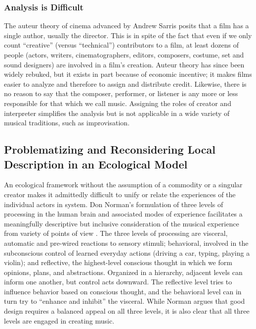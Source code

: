 \subsubsection{Analysis is Difficult}
\label{Gurevich:subsub:4_1_3}
The auteur theory of cinema advanced by Andrew Sarris \cite{Sarris:1963} posits that a film has a single author, usually the director. This is in spite of the fact that even if we only count ``creative'' (versus ``technical'') contributors to a film, at least dozens of people (actors, writers, cinematographers, editors, composers, costume, set and sound designers) are involved in a film's creation. Auteur theory has since been widely rebuked, but it exists in part because of economic incentive; it makes films easier to analyze and therefore to assign and distribute credit. Likewise, there is no reason to say that the composer, performer, or listener is any more or less responsible for that which we call music. Assigning the roles of creator and interpreter simplifies the analysis but is not applicable in a wide variety of musical traditions, such as improvisation.

\subsection{Problematizing and Reconsidering Local Description in an Ecological Model}
\label{Gurevich:sub:4_2}
An ecological framework without the assumption of a commodity or a singular creator makes it admittedly difficult to unify or relate the experiences of the individual actors in system. Don Norman's formulation of three levels of processing in the human brain and associated modes of experience facilitates a meaningfully descriptive but inclusive consideration of the musical experience from variety of points of view \cite{Norman:2004}. The three levels of processing are visceral, automatic and pre-wired reactions to sensory stimuli; behavioral, involved in the subconscious control of learned everyday actions (driving a car, typing, playing a violin); and reflective, the highest-level conscious thought in which we form opinions, plans, and abstractions. Organized in a hierarchy, adjacent levels can inform one another, but control acts downward. The reflective level tries to influence behavior based on conscious thought, and the behavioral level can in turn try to ``enhance and inhibit'' the visceral. While Norman argues that good design requires a balanced appeal on all three levels, it is also clear that all three levels are engaged in creating music.

